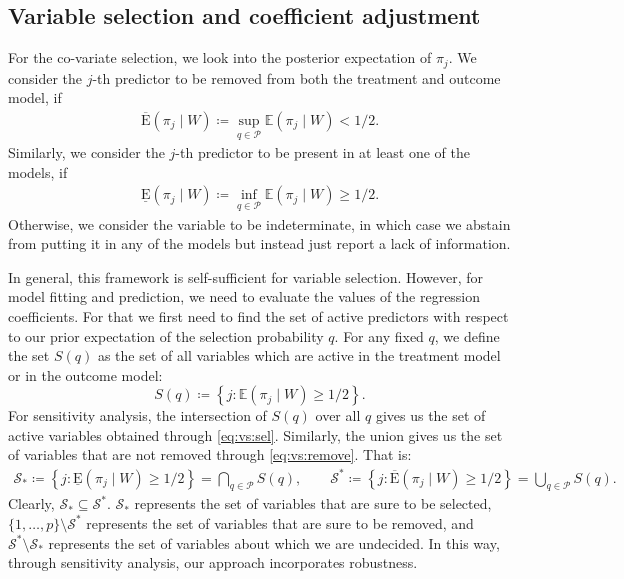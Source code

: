 \documentclass[preprint,12pt]{elsarticle}
\newcommand{\lexp}{\underline{\text{E}}}
\newcommand{\uexp}{\overline{\text{E}}}
\begin{document}
\subsection{Variable selection and coefficient adjustment}
For the co-variate selection, we look into the posterior expectation of $\pi_j$. 
We consider the $j$-th predictor to be removed from both the
treatment and outcome model, if
\begin{align}\label{eq:vs:remove}
	\uexp (\pi_j\mid W)\coloneqq \sup_{q\in \mathcal{P}} \mathbb{E}(\pi_j\mid W) < 1/2.
\end{align}
Similarly, we consider the $j$-th predictor to be present in at least one of the models, if
\begin{align}\label{eq:vs:sel}
	\lexp (\pi_j\mid W)\coloneqq \inf_{q\in \mathcal{P}} \mathbb{E}(\pi_j\mid W) \ge 1/2.
\end{align}
Otherwise, we consider the variable to be indeterminate,  in which case we abstain from putting
it in any of the models but instead just report a lack of information.

In general, this framework is
self-sufficient
for variable selection. However, for
model fitting and prediction, we need to evaluate the values 
of the regression coefficients. For that we first need to find the set of active
predictors with respect to our prior expectation of the selection probability $q$.
For any fixed $q$, we define the set $S(q)$ as the set of all variables which are active
in the treatment model or in the outcome model:
\begin{equation}
	S(q)\coloneqq
	\left\{j\colon \mathbb{E}(\pi_j\mid W) \ge 1/2\right\}.
\end{equation}
For sensitivity analysis,
the intersection of $S(q)$ over all $q$ gives us the set of
active variables obtained through \cref{eq:vs:sel}.
Similarly, the union gives us the set of
variables that are not removed through \cref{eq:vs:remove}.
That is:
\begin{align}
    \mathcal{S}_*\coloneqq \left\{j:\lexp (\pi_j\mid W)\ge1/2\right\}
    = \bigcap_{q\in \mathcal{P}}S(q),
    \qquad \mathcal{S}^*\coloneqq \left\{j:\uexp (\pi_j\mid W)\ge1/2\right\}
    = \bigcup_{q\in \mathcal{P}}S(q).
\end{align}
Clearly, $\mathcal{S}_*\subseteq\mathcal{S}^*$.
$\mathcal{S}_*$ represents the set of variables that are sure to be selected,
$\{1,\dots,p\}\setminus\mathcal{S}^*$ represents the set of variables that are sure to be removed, and
$\mathcal{S}^*\setminus\mathcal{S}_*$ represents the set of variables about which we are undecided.
In this way, through sensitivity analysis, our approach incorporates robustness.
\end{document}
